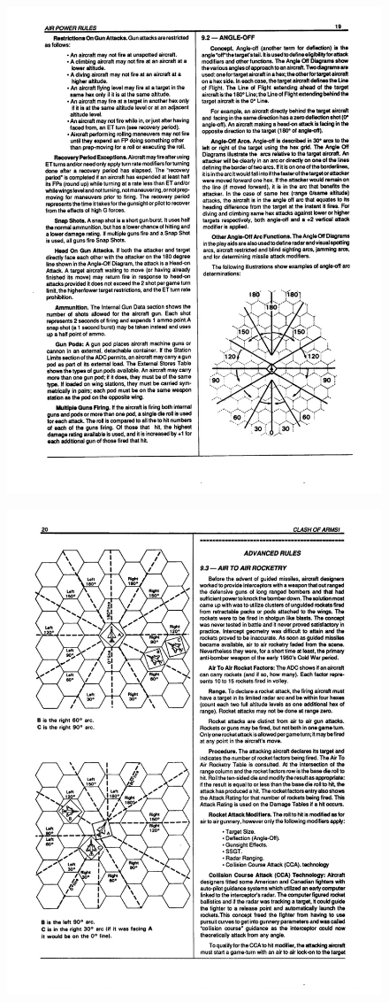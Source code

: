 \begin{figure}
    \centering
    \includegraphics[width=0.9\linewidth]{figures/figure-I.pdf}
\end{figure}

\begin{figure}
    \centering
    \includegraphics[width=0.9\linewidth]{figures/figure-J.pdf}
\end{figure}

